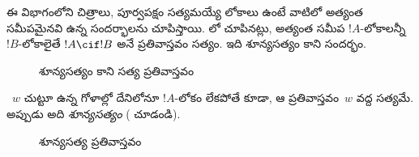 \documentclass[../../../include/open-logic-section]{subfiles}
\begin{document}


ఈ విభాగంలోని చిత్రాలు,
పూర్వపక్షం సత్యమయ్యే లోకాలు ఉంటే వాటిలో
అత్యంత సమీపమైనవి ఉన్న సందర్భాలను చూపిస్తాయి.
లో చూపినట్లు, అత్యంత సమీప $!A$-లోకాలన్నీ
$!B$-లోకాలైతే $!A \cif !B$ అనే ప్రతివాస్తవం సత్యం.
ఇది శూన్యసత్యం కాని సందర్భం.
\begin{figure}
\begin{center}
\caption{శూన్యసత్యం కాని సత్య ప్రతివాస్తవం}
\end{center}
\end{figure}
~$w$ చుట్టూ ఉన్న గోళాల్లో దేనిలోనూ $!A$-లోకం లేకపోతే కూడా,
ఆ ప్రతివాస్తవం~$w$ వద్ద సత్యమే. అప్పుడు అది \emph{శూన్యసత్యం}
( చూడండి).
\begin{figure}
\begin{center}
\caption{శూన్యసత్య ప్రతివాస్తవం}
\end{center}
\end{figure}
\end{document}
